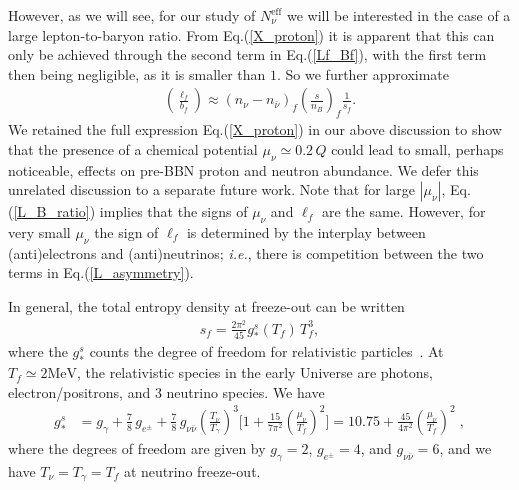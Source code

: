 However, as we will see, for our study of $N_\nu^{\mathrm{eff}}$ we will be interested in the case of a large lepton-to-baryon ratio. From Eq.\;(\ref{X_proton}) it is apparent that this can only be achieved through the second term in Eq.\;(\ref{Lf_Bf}), with the first term then being negligible, as it is smaller than $1$. So we further approximate
\begin{align}\label{L_B_ratio}
\left(\frac{\ell_f}{b_f}\right)  
\approx\left(n_{\nu}-n_{\overline{\nu}}\right)_f \left(\frac{s}{n_B}\right)_f \frac{1}{s_f}.
\end{align}
We retained the full expression Eq.\;(\ref{X_proton}) in our above discussion to show that the presence of a chemical potential $\mu_\nu\simeq 0.2\,Q$ could lead to small, perhaps noticeable, effects on pre-BBN proton and neutron abundance. We defer this unrelated discussion to a separate future work. Note that for large $|\mu_\nu|$, Eq.\;(\ref{L_B_ratio}) implies that the signs of $\mu_\nu$ and $\ell_f$ are the same. However, for very small $\mu_\nu$ the sign of $\ell_f$ is determined by the interplay between (anti)electrons and (anti)neutrinos; {\it i.e.\/}, there is competition between the two terms in Eq.\;(\ref{L_asymmetry}).

In general, the total entropy density at freeze-out can be written
\begin{align}
\label{Entropy_density}
s_f=\frac{2\pi^2}{45}g^s_\ast(T_f)\,T_f^3,
\end{align}
where the $g^s_\ast$ counts the degree of freedom for relativistic particles~\cite{Kolb:1990vq}. At $T_f\simeq 2\mathrm{MeV}$, the relativistic species in the early Universe are photons, electron/positrons, and $3$ neutrino species. We have
\begin{align}
g^s_{\ast}&= g_\gamma+\frac{7}{8}\,g_{e^\pm}+\frac{7}{8}\,g_{\nu\bar{\nu}}\left(\frac{T_\nu}{T_\gamma}\right)^{\!\!3}\bigg[1+\frac{15}{7\pi^2}\left(\frac{\mu_\nu}{T_f}\right)^{\!\!2}\bigg]=10.75+\frac{45}{4\pi^2}\left(\frac{\mu_\nu}{T_f}\right)^{\!\!2}\;,
\end{align}
where the degrees of freedom are given by $g_\gamma=2$, $g_{e^\pm}=4$, and $g_{\nu\bar{\nu}}=6$, and we have $T_\nu=T_\gamma=T_f$ at neutrino freeze-out.

